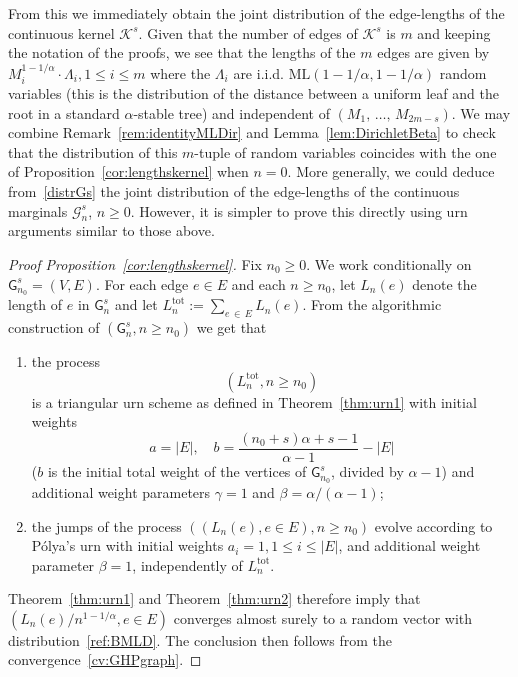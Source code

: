 \documentclass[10pt]{amsart}
\theoremstyle{definition}\newtheorem{defi}[theo]{Definition}\newtheorem{rema}[theo]{Remark}\newtheorem{exam}[theo]{Example}\newtheorem{exem}[theo]{Example}\newtheorem{nota}[theo]{Notation}
\newcommand{\ML}{\mathrm{ML}}
\newcommand{\totl}{\mathrm{tot}}
\newcommand{\cG}{\mathcal{G}}
\newcommand{\cK}{\mathcal{K}}
\newcommand{\sG}{\mathsf{G}}
\newcommand*{\alphenumi}{\renewcommand*{\theenumi}{\alph{enumi}}}
\begin{document}
From this we immediately obtain the joint distribution of the edge-lengths of the continuous kernel $\cK^s$. Given that the number of edges of $\cK^s$ is $m$ and keeping the notation of the proofs, we see that the lengths of the $m$ edges are given by $M_i^{1-1/\alpha} \cdot \Lambda_i, 1 \leq i\leq m$ where the $\Lambda_i$ are i.i.d. $\ML(1-1/\alpha,1-1/\alpha)$ random variables (this is the distribution of the distance between a uniform leaf and the root in a standard $\alpha$-stable tree) and independent of $(M_1,\,\ldots,\,M_{2m-s})$. We may combine Remark~\ref{rem:identityMLDir} and Lemma~\ref{lem:DirichletBeta} to check that the distribution of this $m$-tuple of random variables coincides with the one of Proposition~\ref{cor:lengthskernel} when $n=0$. More generally, we could deduce from~\eqref{distrGs} the joint distribution of the edge-lengths of the continuous marginals $\cG_n^s$, $n \geq 0$. However, it is simpler to prove this directly using urn arguments similar to those above.


\begin{proof}[Proof Proposition~\ref{cor:lengthskernel}] Fix $n_0 \geq 0$. We work conditionally on $\sG^s_{n_0}=(V,E)$. For each edge $e \in E$ and each $n \geq n_0$, let $L_n(e)$ denote the length of $e$ in $\sG^s_n$ and let $L_n^{\totl}:=\sum_{e\,\in\,E} L_n(e)$.
From the algorithmic construction of $(\sG^s_n,n \geq n_0)$ we get that
\begin{enumerate}\alphenumi
\item\label{proof prop1.7.a} the process
\[
\left(L_n^{\totl}, n \geq n_0\right)
\]
is a triangular urn scheme as defined in Theorem~\ref{thm:urn1} with initial weights
\[
a=|E|, \quad b=\frac{(n_0+s)\alpha+s-1}{\alpha-1}-|E|
\]
($b$ is the initial total weight of the vertices of $\sG^s_{n_0}$, divided by $\alpha-1$) and additional weight parameters $\gamma=1$ and $\beta=\alpha/(\alpha-1)$;
\item\label{proof prop1.7.b} the jumps of the process $((L_n(e),e \in E),n\geq n_0)$ evolve according to P{\'o}lya's urn with initial weights $a_i=1,1 \leq i \leq |E|$, and additional weight parameter $\beta=1$, independently of $L_n^{\totl}$.
\end{enumerate}
Theorem~\ref{thm:urn1} and Theorem~\ref{thm:urn2} therefore imply that $(L_n(e)/n^{1-1/\alpha}, e \in E)$ converges almost surely to a random vector with distribution~\eqref{ref:BMLD}. The conclusion then follows from the convergence~\eqref{cv:GHPgraph}.
\end{proof}
\end{document}
